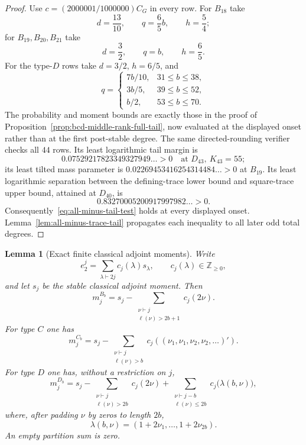 \documentclass[11pt,reqno]{amsart}
\theoremstyle{plain}
\newtheorem{lemma}[theorem]{Lemma}
\theoremstyle{definition}
\begin{document}
\begin{proof}
Use $c=(2000001/1000000)C_G$ in every row.  For $B_{18}$ take
\[
 d=\frac{13}{10},\qquad q=\frac65b,\qquad h=\frac54;
\]
for $B_{19},B_{20},B_{21}$ take
\[
 d=\frac32,\qquad q=b,\qquad h=\frac65.
\]
For the type-$D$ rows take $d=3/2$, $h=6/5$, and
\[
 q=\begin{cases}
  7b/10,&31\leq b\leq38,\\
  3b/5,&39\leq b\leq52,\\
  b/2,&53\leq b\leq70.
 \end{cases}
\]
The probability and moment bounds are exactly those in the proof of
Proposition~\ref{prop:bcd-middle-rank-full-tail}, now evaluated at the
displayed onset rather than at the first post-stable degree.  The same
directed-rounding verifier checks all $44$ rows.  Its least logarithmic
tail margin is
\[
 0.07529217823349327949\ldots>0
 \quad\text{at }D_{43},\ K_{43}=55;
\]
its least tilted mass parameter is
$0.02269453416254314484\ldots>0$ at $B_{19}$.  Its least logarithmic
separation between the defining-trace lower bound and square-trace upper
bound, attained at $D_{40}$, is
\[
 0.83270005200917997982\ldots>0.
\]
Consequently~\eqref{eq:all-minus-tail-test} holds at every displayed
onset.  Lemma~\ref{lem:all-minus-trace-tail} propagates each inequality to
all later odd total degrees.
\end{proof}

\begin{lemma}[Exact finite classical adjoint moments]
\label{lem:finite-orthogonal-adjoint-moments}
Write
\[
 e_2^j=\sum_{\lambda\vdash2j}c_j(\lambda)s_\lambda,
 \qquad c_j(\lambda)\in\mathbb Z_{\geq0},
\]
and let $s_j$ be the stable classical adjoint moment.  Then
\[
 m_j^{B_b}=s_j-
 \sum_{\substack{\nu\vdash j\\\ell(\nu)>2b+1}}
 c_j(2\nu).
\]
For type $C$ one has
\[
 m_j^{C_b}=s_j-
 \sum_{\substack{\nu\vdash j\\\ell(\nu)>b}}
 c_j\!\left((\nu_1,\nu_1,\nu_2,\nu_2,\ldots)'\right).
\]
For type $D$ one has, without a restriction on $j$,
\[
 m_j^{D_b}=s_j-
 \sum_{\substack{\nu\vdash j\\\ell(\nu)>2b}}c_j(2\nu)
 +\sum_{\substack{\nu\vdash j-b\\\ell(\nu)\leq2b}}
 c_j\bigl(\lambda(b,\nu)\bigr),
\]
where, after padding $\nu$ by zeros to length $2b$,
\[
 \lambda(b,\nu)=(1+2\nu_1,\ldots,1+2\nu_{2b}).
\]
An empty partition sum is zero.
\end{lemma}
\end{document}
